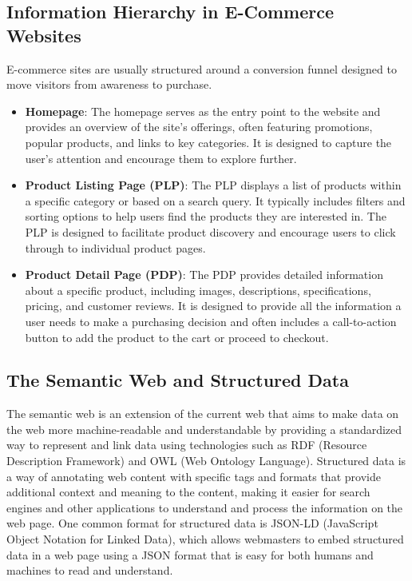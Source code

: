 \subsection{Information Hierarchy in E-Commerce Websites}\label{subsec:information_hierarchy_in_ecommerce_websites}
E-commerce sites are usually structured around a conversion funnel designed to move visitors from awareness to purchase\cite{YotpoEcommerceFunnel}.
\begin{itemize}
    \item \textbf{Homepage}: The homepage serves as the entry point to the website and provides an overview of the site's offerings, often featuring promotions, popular products, and links to key categories.
    It is designed to capture the user's attention and encourage them to explore further.

    \item \textbf{Product Listing Page (PLP)}: The PLP displays a list of products within a specific category or based on a search query.
    It typically includes filters and sorting options to help users find the products they are interested in.
    The PLP is designed to facilitate product discovery and encourage users to click through to individual product pages.

    \item \textbf{Product Detail Page (PDP)}: The PDP provides detailed information about a specific product, including images, descriptions, specifications, pricing, and customer reviews.
    It is designed to provide all the information a user needs to make a purchasing decision and often includes a call-to-action button to add the product to the cart or proceed to checkout.
\end{itemize}

\subsection{The Semantic Web and Structured Data}\label{subsec:semantic_web_and_structured_data}
The semantic web is an extension of the current web that aims to make data on the web more machine-readable and understandable by providing a standardized way to represent and link data using technologies such as RDF (Resource Description Framework) and OWL (Web Ontology Language).
Structured data is a way of annotating web content with specific tags and formats that provide additional context and meaning to the content, making it easier for search engines and other applications to understand and process the information on the web page.
One common format for structured data is JSON-LD (JavaScript Object Notation for Linked Data), which allows webmasters to embed structured data in a web page using a JSON format that is easy for both humans and machines to read and understand\cite{lanthaler2012using}.

